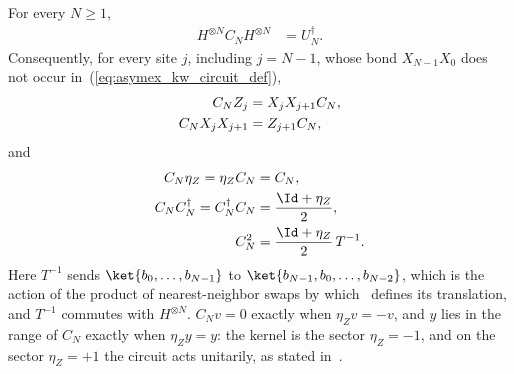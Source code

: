 \begin{lemma}
    \label{prop:asymex_kw_circuit}
    \leanok
    For every $N\geq1$,
    \begin{align}
        H^{\otimes N}C_NH^{\otimes N} & =U_N^\dagger.
        \label{eq:asymex_kw_circuit}
    \end{align}
    Consequently, for every site $j$, including $j=N-1$, whose bond
    $X_{N-1}X_0$ does not occur in~(\ref{eq:asymex_kw_circuit_def}),
    \begin{align}
        C_NZ_j        & =X_jX_{j+1}C_N,
        \notag                          \\
        C_NX_jX_{j+1} & =Z_{j+1}C_N,
        \notag
    \end{align}
    and
    \begin{align}
        C_N\eta_Z=\eta_ZC_N            & =C_N,
        \notag                                                          \\
        C_NC_N^\dagger=C_N^\dagger C_N & =\frac{\Id+\eta_Z}{2},
        \notag                                                          \\
        C_N^2                          & =\frac{\Id+\eta_Z}{2}\,T^{-1}.
        \notag
    \end{align}
    Here $T^{-1}$ sends $\ket{b_0,\ldots,b_{N-1}}$ to
    $\ket{b_{N-1},b_0,\ldots,b_{N-2}}$, which is the action of the
    product of nearest-neighbor swaps by which~\cite{Seiberg2024Majorana}
    defines its translation, and $T^{-1}$ commutes with $H^{\otimes N}$.
    $C_Nv=0$ exactly when $\eta_Zv=-v$, and $y$ lies in the
    range of $C_N$ exactly when $\eta_Zy=y$: the kernel is the sector
    $\eta_Z=-1$, and on the sector $\eta_Z=+1$ the circuit acts
    unitarily, as stated in~\cite{Seiberg2024Majorana}.
\end{lemma}

